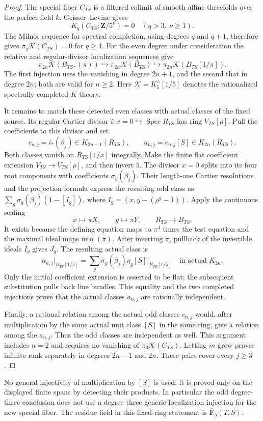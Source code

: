 \begin{proof}
The special fiber $C_{TS}$ is a filtered colimit of smooth
affine threefolds over the perfect field $k$.  Geisser--Levine
\cite[Theorem~8.4]{GeisserLevineCharP} gives
\[
 K_q(C_{TS};\mathbf Z/5^\nu)=0
      \quad(q>3,\ \nu\geq1).
\]
The Milnor sequence for spectral completion, using degrees
$q$ and $q+1$, therefore gives
$\pi_q\mathcal K(C_{TS})=0$ for $q\geq4$.
For the even degree under consideration the relative and
regular-divisor localization sequences give
\[
 \pi_{2n}\mathcal K(B_{TS},(\pi))
   \hookrightarrow\pi_{2n}\mathcal K(B_{TS})
   \hookrightarrow\pi_{2n}\mathcal K(B_{TS}[1/\pi]).
\]
The first injection uses the vanishing in degree $2n+1$,
and the second that in degree $2n$; both are valid for $n\geq2$.
Here $\mathcal K=K^\wedge_5[1/5]$ denotes the rationalized
spectrally completed $K$-theory.

It remains to match these detected even classes with actual
classes of the fixed source.  Its regular Cartier divisor
$i:x=0\hookrightarrow\operatorname{Spec}R_{TS}$ has ring
$V_{TS}[\rho]$.  Pull the coefficients to this divisor and set
\[
 c_{n,j}=i_*(\beta_j)\in K_{2n-1}(R_{TS}),\qquad
 a_{n,j}=c_{n,j}[S]\in K_{2n}(R_{TS}).
\]
Both classes vanish on $R_{TS}[1/x]$ integrally.
Make the finite flat coefficient extension
$V_{TS}\to V_{TS}[\rho]$, and then invert $5$.
The divisor $x=0$ splits into its four root components with
coefficients $\sigma_g(\beta_j)$.
Their length-one Cartier resolutions and the projection
formula express the resulting odd class as
$\sum_g\sigma_g(\beta_j)(1-[I_g])$, where
$I_g=(x,y-(\rho^g-1))$.
Apply the continuous scaling
\[
 x\longmapsto\pi X,\qquad y\longmapsto\pi Y,\qquad
 R_{TS}\longrightarrow B_{TS}.
\]
It exists because the defining equation maps to $\pi^4$ times
the test equation and the maximal ideal maps into $(\pi)$.
After inverting $\pi$, pullback of the invertible ideals $I_g$
gives $J_g$. The resulting actual class is
\[
 a_{n,j}|_{B_{TS}[1/\pi]}
   =\sum_g\sigma_g(\beta_j)\eta_g[S]\big|_{B_{TS}[1/\pi]}
       \quad\text{in actual }K_{2n}.
\]
Only the initial coefficient extension is asserted to be flat;
the subsequent substitution pulls back line bundles.
This equality and the two completed injections prove that
the actual classes $a_{n,j}$ are rationally independent.

Finally, a rational relation among the actual odd classes
$c_{n,j}$ would, after multiplication by the same actual unit
class $[S]$ in the same ring, give a relation among the
$a_{n,j}$.  Thus the odd classes are independent as well.
This argument includes $n=2$ and requires no vanishing of
$\pi_3\mathcal K(C_{TS})$.
Letting $m$ grow proves infinite rank separately in degrees
$2n-1$ and $2n$.  These pairs cover every $j\geq3$.
\end{proof}

\begin{remark}
No general injectivity of multiplication by $[S]$ is used:
it is proved only on the displayed finite spans by detecting
their products.  In particular the odd degree-three conclusion
does not use a degree-three generic-localization injection for
the new special fiber.  The residue field in this fixed-ring
statement is $\overline{\mathbf F}_5(T,S)$.
\end{remark}

